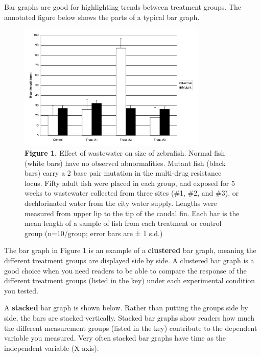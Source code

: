 \documentclass[
]{book}
\begin{document}
Bar graphs are good for highlighting trends between treatment groups. The annotated figure below shows the parts of a typical bar graph.

\begin{figure}
\centering
\includegraphics[width=0.8\textwidth,height=\textheight]{images/Annotated-bar-graph.png}
\caption{\textbf{Figure 1.} Effect of wastewater on size of zebrafish. Normal fish (white bars) have no observed abnormalities. Mutant fish (black bars) carry a 2 base pair mutation in the multi-drug resistance locus. Fifty adult fish were placed in each group, and exposed for 5 weeks to wastewater collected from three sites (\#1, \#2, and \#3), or dechlorinated water from the city water supply. Lengths were measured from upper lip to the tip of the caudal fin. Each bar is the mean length of a sample of fish from each treatment or control group (n=10/group; error bars are ± 1 s.d.)}
\end{figure}

The bar graph in Figure 1 is an example of a \textbf{clustered} bar graph, meaning the different treatment groups are displayed side by side. A clustered bar graph is a good choice when you need readers to be able to compare the response of the different treatment groups (listed in the key) under each experimental condition you tested.

A \textbf{stacked} bar graph is shown below. Rather than putting the groups side by side, the bars are stacked vertically. Stacked bar graphs show readers how much the different measurement groups (listed in the key) contribute to the dependent variable you measured. Very often stacked bar graphs have time as the independent variable (X axis).
\end{document}
